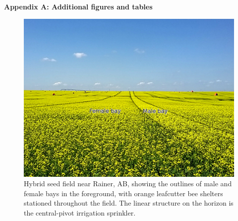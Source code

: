 \setcounter{equation}{0} %
\makeatletter
\renewcommand{\theequation}{S\arabic{equation}} %
\renewcommand{\thefigure}{S\arabic{figure}}
\renewcommand{\thetable}{S\arabic{table}}
\renewcommand{\bibnumfmt}[1]{[S#1]}
\renewcommand{\citenumfont}[1]{S#1}

\pagebreak
\begin{center}
\textbf{\large Appendix A: Additional figures and tables}
\end{center}



\begin{figure}
    \centering
    \includegraphics[width=\textwidth,keepaspectratio=true]{seedfieldBays.jpg}
    \caption[Hybrid seed field near Rainer, AB]{Hybrid seed field near Rainer, AB, showing the outlines of male and female bays in the foreground, with orange leafcutter bee shelters stationed throughout the field. The linear structure on the horizon is the central-pivot irrigation sprinkler.}
    \label{fig:seedfieldPhoto}
\end{figure}


